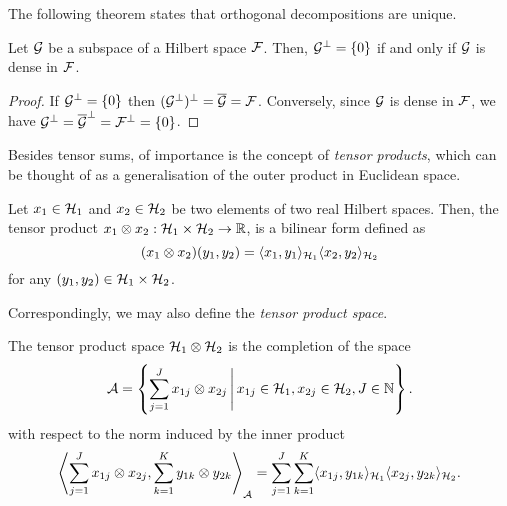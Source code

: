 The following theorem states that orthogonal decompositions are unique.

\begin{corollary}\label{thm:orthdecomp2}
  Let ${\mathcal G}$ be a subspace of a Hilbert space ${\mathcal F}$. 
  Then, ${\mathcal G}^\bot = \{0\}$ if and only if ${\mathcal G}$ is dense in ${\mathcal F}$.
\end{corollary}

\begin{proof}
  If ${\mathcal G}^\bot=\{0\}$ then $({\mathcal G}^\bot)^\bot = \overline {{\mathcal G}} = {\mathcal F}$.
  Conversely, since ${\mathcal G}$ is dense in ${\mathcal F}$, we have ${\mathcal G}^\bot = \overline{{\mathcal G}}^\bot = {\mathcal F}^\bot = \{0\}$.
\end{proof}


Besides tensor sums, of importance is the concept of \emph{tensor products}, which can be thought of as a generalisation of the outer product in Euclidean space.

\begin{definition}\label{def:tensorprod}
  Let $x_1\in{\mathcal H}_1$ and $x_2\in{\mathcal H}_2$ be two elements of two real Hilbert spaces.
  Then, the tensor product $x_1 \otimes x_2:{\mathcal H}_1\times{\mathcal H}_2\to\mathbb{R}$, is a bilinear form defined as
  \[
    (x_1\otimes x_2)(y_1,y_2) = \langle x_1,y_1\rangle_{{\mathcal H}_1}\langle x_2,y_2\rangle_{{\mathcal H}_2}
  \]
  for any $(y_1,y_2)\in{\mathcal H}_1\times{\mathcal H}_2$.
\end{definition}

Correspondingly, we may also define the \emph{tensor product space}.

\begin{definition}\label{def:tensprodspace}
  The tensor product space ${\mathcal H}_1\otimes{\mathcal H}_2$ is the completion of the space
  \[
    {\mathcal A} = \left\{ \sum_{j=1}^J x_{1j} \otimes x_{2j} \,\Bigg\vert\, x_{1j}\in{\mathcal H}_1, x_{2j}\in{\mathcal H}_2, J \in \mathbb{N} \right\}.
  \]
  with respect to the norm induced by the inner product
  \[
    \left\langle  \sum_{j=1}^J x_{1j} \otimes x_{2j},  \sum_{k=1}^K y_{1k} \otimes y_{2k} \right\rangle_{\mathcal A} = \sum_{j=1}^J\sum_{k=1}^K \langle x_{1j},y_{1k}\rangle_{{\mathcal H}_1} \langle x_{2j},y_{2k}\rangle_{{\mathcal H}_2}.
  \]
\end{definition}

